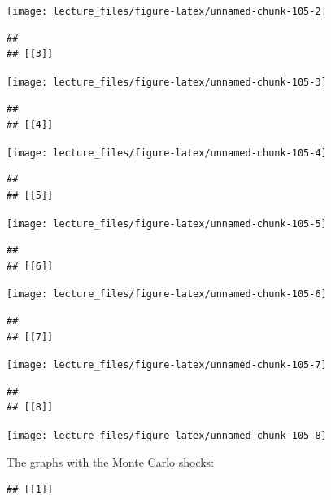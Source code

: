 \documentclass[
]{book}
\begin{document}
\begin{center}\texttt{[image: lecture\_files/figure-latex/unnamed-chunk-105-2]} \end{center}

\begin{verbatim}
## 
## [[3]]
\end{verbatim}

\begin{center}\texttt{[image: lecture\_files/figure-latex/unnamed-chunk-105-3]} \end{center}

\begin{verbatim}
## 
## [[4]]
\end{verbatim}

\begin{center}\texttt{[image: lecture\_files/figure-latex/unnamed-chunk-105-4]} \end{center}

\begin{verbatim}
## 
## [[5]]
\end{verbatim}

\begin{center}\texttt{[image: lecture\_files/figure-latex/unnamed-chunk-105-5]} \end{center}

\begin{verbatim}
## 
## [[6]]
\end{verbatim}

\begin{center}\texttt{[image: lecture\_files/figure-latex/unnamed-chunk-105-6]} \end{center}

\begin{verbatim}
## 
## [[7]]
\end{verbatim}

\begin{center}\texttt{[image: lecture\_files/figure-latex/unnamed-chunk-105-7]} \end{center}

\begin{verbatim}
## 
## [[8]]
\end{verbatim}

\begin{center}\texttt{[image: lecture\_files/figure-latex/unnamed-chunk-105-8]} \end{center}

The graphs with the Monte Carlo shocks:

\begin{verbatim}
## [[1]]
\end{verbatim}
\end{document}
